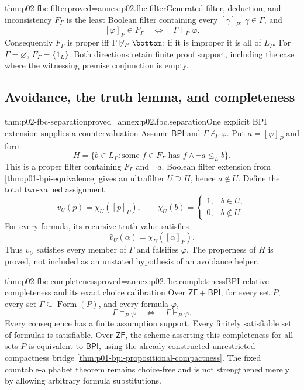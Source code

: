 \begin{hbtheorem}{thm:p02-fbc-filter}{proved=annex:p02.fbc.filter}{Generated filter, deduction, and inconsistency}
\(F_\Gamma\) is the least Boolean filter containing every
\([\gamma]_P\), \(\gamma\in\Gamma\), and
\[
 [\varphi]_P\in F_\Gamma
             \quad\Longleftrightarrow\quad
 \Gamma\vdash_P\varphi .
\]
Consequently \(F_\Gamma\) is proper iff
\(\Gamma\not\vdash_P\bottom\); if it is improper it is all of \(L_P\).
For \(\Gamma=\varnothing\), \(F_\Gamma=\{1_L\}\).
Both directions retain finite proof support, including the case
where the witnessing premise conjunction is empty.
\end{hbtheorem}

\subsection{Avoidance, the truth lemma, and completeness}
\label{sec:p02-fbc-completeness}

\begin{hbtheorem}{thm:p02-fbc-separation}{proved=annex:p02.fbc.separation}{One explicit BPI extension supplies a countervaluation}
Assume \(\mathsf{BPI}\) and \(\Gamma\not\vdash_P\varphi\).
Put \(a=[\varphi]_P\) and form
\[
 H=\{b\in L_P:
          \text{some }f\in F_\Gamma\text{ has }f\wedge\neg a\leq_L b\}.
\]
This is a proper filter containing \(F_\Gamma\) and \(\neg a\).
Boolean filter extension from \cref{thm:p01-bpi-equivalence} gives
an ultrafilter \(U\supseteq H\), hence \(a\notin U\).
Define the total two-valued assignment
\[
 v_U(p)=\chi_U([p]_P),\qquad
 \chi_U(b)=
 \begin{cases}1,&b\in U,\\0,&b\notin U.\end{cases}
\]
For every formula, its recursive truth value satisfies
\[
 \widehat v_U(\alpha)=\chi_U([\alpha]_P).
\]
Thus \(v_U\) satisfies every member of \(\Gamma\) and falsifies
\(\varphi\). The properness of \(H\) is proved, not included as an
unstated hypothesis of an avoidance helper.
\end{hbtheorem}

\begin{hbtheorem}{thm:p02-fbc-completeness}{proved=annex:p02.fbc.completeness}{BPI-relative completeness and its exact choice calibration}
Over \(\mathsf{ZF}+\mathsf{BPI}\), for every set \(P\), every set
\(\Gamma\subseteq\operatorname{Form}(P)\), and every formula \(\varphi\),
\[
 \Gamma\models_P\varphi
       \quad\Longleftrightarrow\quad
 \Gamma\vdash_P\varphi .
\]
Every consequence has a finite assumption support. Every finitely
satisfiable set of formulas is satisfiable.
Over \(\mathsf{ZF}\), the scheme asserting this completeness for
all sets \(P\) is equivalent to \(\mathsf{BPI}\), using the
already constructed unrestricted compactness bridge
\cref{thm:p01-bpi-propositional-compactness}.
The fixed countable-alphabet theorem remains choice-free and is not
strengthened merely by allowing arbitrary formula substitutions.
\end{hbtheorem}

